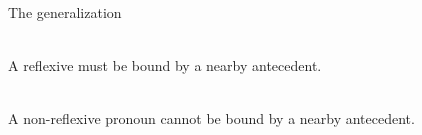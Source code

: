 \documentclass[ignorenonframetext,10pt,aspectratio=169]{beamer}
\begin{document}
\begin{frame}[t,plain]{The generalization}

		\vspace{40pt}

		\\	
		A reflexive \alert{must} be bound by a nearby antecedent.

\bigskip

		\\
		A non-reflexive pronoun \alert{cannot} be bound by a nearby antecedent. 


\end{frame}

\begin{frame}[t,plain]{}

\end{frame}

\begin{frame}[t,plain]{}

\end{frame}

\begin{frame}[t,plain]{}

\end{frame}
\end{document}
